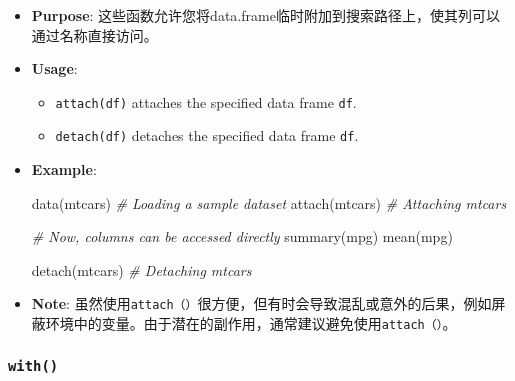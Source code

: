 \documentclass[
]{article}
\newenvironment{Shaded}{}{}
\newcommand{\CommentTok}[1]{\textcolor[rgb]{0.38,0.63,0.69}{\textit{#1}}}
\newcommand{\FunctionTok}[1]{\textcolor[rgb]{0.02,0.16,0.49}{#1}}
\newcommand{\NormalTok}[1]{#1}
\begin{document}
\begin{itemize}
\item
  \textbf{Purpose}:
  这些函数允许您将data.frame临时附加到搜索路径上，使其列可以通过名称直接访问。
\item
  \textbf{Usage}:

  \begin{itemize}
  \item
    \texttt{attach(df)} attaches the specified data frame \texttt{df}.
  \item
    \texttt{detach(df)} detaches the specified data frame \texttt{df}.
  \end{itemize}
\item
  \textbf{Example}:

\begin{Shaded}
\begin{Highlighting}[]
\FunctionTok{data}\NormalTok{(mtcars) }\CommentTok{\# Loading a sample dataset}
\FunctionTok{attach}\NormalTok{(mtcars) }\CommentTok{\# Attaching mtcars}

\CommentTok{\# Now, columns can be accessed directly}
\FunctionTok{summary}\NormalTok{(mpg)}
\FunctionTok{mean}\NormalTok{(mpg)}

\FunctionTok{detach}\NormalTok{(mtcars) }\CommentTok{\# Detaching mtcars}
\end{Highlighting}
\end{Shaded}
\item
  \textbf{Note}:
  虽然使用\texttt{attach（）}很方便，但有时会导致混乱或意外的后果，例如屏蔽环境中的变量。由于潜在的副作用，通常建议避免使用\texttt{attach（）}。
\end{itemize}

\hypertarget{with}{%
\subsubsection{\texorpdfstring{\texttt{with()}}{with()}}\label{with}}
\end{document}
